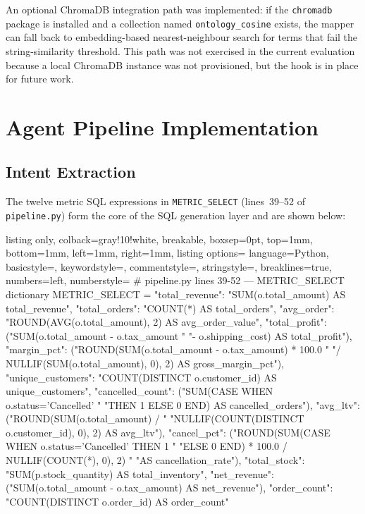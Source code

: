 \documentclass[12pt,a4paper]{report}
\begin{document}
An optional ChromaDB integration path was implemented: if the \texttt{chromadb} package is installed and a collection named \texttt{ontology\_cosine} exists, the mapper can fall back to embedding-based nearest-neighbour search for terms that fail the string-similarity threshold. This path was not exercised in the current evaluation because a local ChromaDB instance was not provisioned, but the hook is in place for future work.

\section{Agent Pipeline Implementation}
\label{sec:pipeline-impl}

\subsection{Intent Extraction}
\label{subsec:intent-impl}

The twelve metric SQL expressions in \texttt{METRIC\_SELECT} (lines~39--52 of \texttt{pipeline.py}) form the core of the SQL generation layer and are shown below:

\begin{tcblisting}{listing only, colback=gray!10!white, breakable, boxsep=0pt,
  top=1mm, bottom=1mm, left=1mm, right=1mm,
  listing options={
    language=Python, basicstyle=\small\ttfamily,
    keywordstyle=\color{kwcolor}, commentstyle=\color{cmtcolor},
    stringstyle=\color{strcolor}, breaklines=true,
    numbers=left, numberstyle=\tiny\color{gray}}}
# pipeline.py lines 39-52 — METRIC_SELECT dictionary
METRIC_SELECT = {
    "total_revenue":   "SUM(o.total_amount) AS total_revenue",
    "total_orders":    "COUNT(*) AS total_orders",
    "avg_order":       "ROUND(AVG(o.total_amount), 2) AS avg_order_value",
    "total_profit":    ("SUM(o.total_amount - o.tax_amount "
                        "- o.shipping_cost) AS total_profit"),
    "margin_pct":      ("ROUND(SUM(o.total_amount - o.tax_amount) * 100.0 "
                        "/ NULLIF(SUM(o.total_amount), 0), 2) AS gross_margin_pct"),
    "unique_customers": "COUNT(DISTINCT o.customer_id) AS unique_customers",
    "cancelled_count":  ("SUM(CASE WHEN o.status='Cancelled' "
                         "THEN 1 ELSE 0 END) AS cancelled_orders"),
    "avg_ltv":          ("ROUND(SUM(o.total_amount) / "
                         "NULLIF(COUNT(DISTINCT o.customer_id), 0), 2) AS avg_ltv"),
    "cancel_pct":       ("ROUND(SUM(CASE WHEN o.status='Cancelled' THEN 1 "
                         "ELSE 0 END) * 100.0 / NULLIF(COUNT(*), 0), 2) "
                         "AS cancellation_rate"),
    "total_stock":      "SUM(p.stock_quantity) AS total_inventory",
    "net_revenue":      ("SUM(o.total_amount - o.tax_amount) AS net_revenue"),
    "order_count":      "COUNT(DISTINCT o.order_id) AS order_count"
}
\end{tcblisting}
\end{document}
